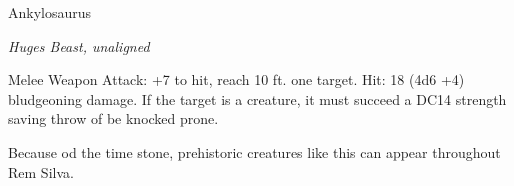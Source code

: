 \begin{monsterbox}{Ankylosaurus}
	\begin{hangingpar}
		\textit{Huges Beast, unaligned}
	\end{hangingpar}
	\dndline%
	\basics[%
	armorclass = 15,
	hitpoints  = 68,
	speed      = 30 ft
	]
	\dndline%
	\stats[
	STR = \stat{19}, %
	DEX = \stat{11},
	CON = \stat{15},
	INT = \stat{2},
	WIS = \stat{12},
	CHA = \stat{5}
	]
	\dndline%
	\details[%
	senses = {passive perception 11},
	challenge = 3 (700XP)
	]
	\dndline%
	\begin{monsteraction}[Tail]
		Melee Weapon Attack: +7 to hit, reach 10 ft. one target. Hit: 18 (4d6 +4) bludgeoning damage. If the target is a creature, it must succeed a DC14 strength saving throw of be knocked prone.
	\end{monsteraction}
		Because od the time stone, prehistoric creatures like this can appear throughout Rem Silva.
\end{monsterbox}

